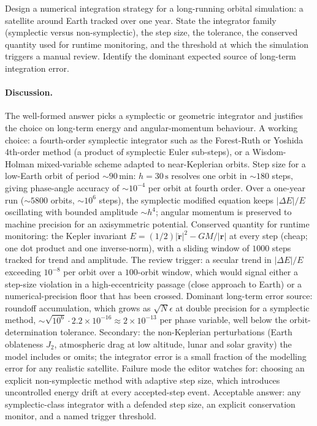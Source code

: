 \begin{exercise}
Design a numerical integration strategy for a long-running
orbital simulation: a satellite around Earth tracked over one
year. State the integrator family (symplectic versus
non-symplectic), the step size, the tolerance, the conserved
quantity used for runtime monitoring, and the threshold at which
the simulation triggers a manual review. Identify the dominant
expected source of long-term integration error.

\paragraph{Discussion.} The well-formed answer picks a symplectic
or geometric integrator and justifies the choice on long-term
energy and angular-momentum behaviour. A working choice: a
fourth-order symplectic integrator such as the Forest-Ruth or
Yoshida 4th-order method (a product of symplectic Euler
sub-steps), or a Wisdom-Holman mixed-variable scheme adapted to
near-Keplerian orbits. Step size for a low-Earth orbit of period
$\sim 90\,\si{\minute}$: $h = 30\,\si{\second}$ resolves one
orbit in $\sim 180$ steps, giving phase-angle accuracy of
$\sim 10^{-4}$ per orbit at fourth order. Over a one-year run
($\sim 5800$ orbits, $\sim 10^{6}$ steps), the symplectic
modified equation keeps $|\Delta E|/E$ oscillating with bounded
amplitude $\sim h^{4}$; angular momentum is preserved to
machine precision for an axisymmetric potential. Conserved
quantity for runtime monitoring: the Kepler invariant $E =
(1/2)|\dot{\mathbf{r}}|^{2} - GM/|\mathbf{r}|$ at every step
(cheap; one dot product and one inverse-norm), with a sliding
window of $1000$ steps tracked for trend and amplitude. The
review trigger: a secular trend in $|\Delta E|/E$ exceeding
$10^{-8}$ per orbit over a $100$-orbit window, which would
signal either a step-size violation in a high-eccentricity
passage (close approach to Earth) or a numerical-precision
floor that has been crossed. Dominant long-term error source:
roundoff accumulation, which grows as $\sqrt{N} \epsilon$ at
double precision for a symplectic method, $\sim \sqrt{10^{6}}
\cdot 2.2 \times 10^{-16} \approx 2 \times 10^{-13}$ per phase
variable, well below the orbit-determination tolerance.
Secondary: the non-Keplerian perturbations (Earth oblateness
$J_{2}$, atmospheric drag at low altitude, lunar and solar
gravity) the model includes or omits; the integrator error is
a small fraction of the modelling error for any realistic
satellite. Failure mode the editor watches for: choosing an
explicit non-symplectic method with adaptive step size, which
introduces uncontrolled energy drift at every accepted-step
event. Acceptable answer: any symplectic-class integrator with a
defended step size, an explicit conservation monitor, and a
named trigger threshold.
\end{exercise}

